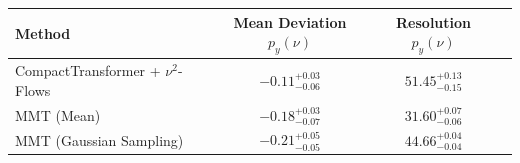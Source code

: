     \begin{tabular}{lccc}
        \toprule
        Method & Mean Deviation $p_{y}(\nu)$ & Resolution $p_{y}(\nu)$ \\
        \midrule
        CompactTransformer + $\nu^2$-Flows & $-0.11^{+0.03}_{-0.06}$ & $51.45^{+0.13}_{-0.15}$ \\
        MMT (Mean) & $-0.18^{+0.03}_{-0.07}$ & $31.60^{+0.07}_{-0.06}$ \\
        MMT (Gaussian Sampling) & $-0.21^{+0.05}_{-0.05}$ & $44.66^{+0.04}_{-0.04}$ \\
        \bottomrule
    \end{tabular}